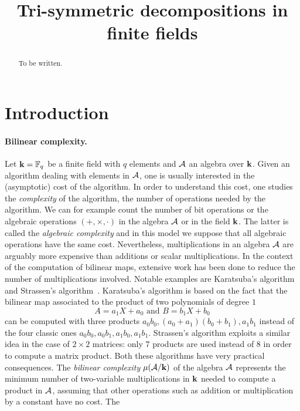 \documentclass[a4paper,11pt]{article}
\title{Tri-symmetric decompositions in finite fields}
\author{}
\begin{document}
\maketitle

\begin{abstract}
  To be written.
\end{abstract}


\section{Introduction}
\label{sec:intro}

\paragraph{Bilinear complexity.} Let $\mathbf{k}=\mathbb{F}_{q}$ be a finite field with
$q$ elements and $\mathcal{A}$
an algebra over $\mathbf{k}$. Given an algorithm dealing with elements in $\mathcal{A}$, one is
usually interested in the (asymptotic) cost of the algorithm. In order to
understand this cost, one studies the \emph{complexity} of the algorithm, \ie
the number of operations needed by the algorithm. We can for example count the number
of bit operations or the algebraic operations $(+, \times, \cdot)$ in the algebra
$\mathcal{A}$ or in the field $\mathbf{k}$. The latter is called the \emph{algebraic complexity}
and in this model we suppose that all algebraic operations have the same cost.
Nevertheless, multiplications in an algebra $\mathcal{A}$ are arguably more expensive than
additions or scalar multiplications. In the context of the computation of
bilinear maps, extensive work has been done to reduce the number of
multiplications involved. Notable examples are Karatsuba's
algorithm~\cite{Karatsuba63} and
Strassen's algorithm~\cite{Strassen69}. Karatsuba's algorithm is
based on the fact that the bilinear map associated to the product of two
polynomials of degree $1$
\[
  A = a_1 X + a_0\text{ and }B = b_1 X + b_0
\]
can be computed with three products $a_0b_0, (a_0+a_1)(b_0+b_1), a_1b_1$ instead
of the four classic ones $a_0b_0, a_0b_1, a_1b_0, a_1b_1$. Strassen's algorithm
exploits a similar idea in the case of $2\times2$ matrices: only $7$ products
are used instead of $8$ in order to compute a matrix product. Both these
algorithms have very practical consequences. The \emph{bilinear complexity}
$\mu(\mathcal{A}/\mathbf{k})$ of the algebra $\mathcal{A}$ represents the minimum number of two-variable
multiplications in $\mathbf{k}$ needed to compute a product in $\mathcal{A}$, assuming that other
operations such as addition or multiplication by a constant have no cost. The
\end{document}
